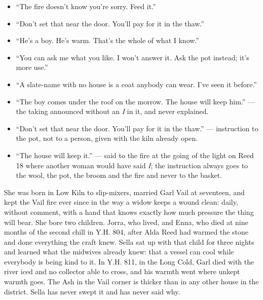 \documentclass{design/chronicle}
\begin{document}
{\begin{itemize}[leftmargin=1.4em,itemsep=1pt,topsep=3pt,parsep=0pt]

\item “The fire doesn’t know you’re sorry. Feed it.”

\item “Don’t set that near the door. You’ll pay for it in the thaw.”

\item “He’s a boy. He’s warm. That’s the whole of what I know.”

\item “You can ask me what you like. I won’t answer it. Ask the pot instead; it’s more use.”

\item “A slate-name with no house is a coat anybody can wear. I’ve seen it before.”

\item “The boy comes under the roof on the morrow. The house will keep him.” --- the taking announced without an \emph{I} in it, and never explained.

\item “Don’t set that near the door. You’ll pay for it in the thaw.” --- instruction to the pot, not to a person, given with the kiln already open.

\item “The house will keep it.” --- said to the fire at the going of the light on Reed 18 where another woman would have said \emph{I}; the instruction always goes to the wool, the pot, the broom and the fire and never to the basket.

\end{itemize}

She was born in Low Kiln to slip-mixers, married Garl Vail at seventeen, and kept the Vail fire ever since in the way a widow keeps a wound clean: daily, without comment, with a hand that knows exactly how much pressure the thing will bear. She bore two children. Jorra, who lived, and Enna, who died at nine months of the second chill in Y.H. 804, after Alda Reed had warmed the stone and done everything the craft knew. Sella sat up with that child for three nights and learned what the midwives already knew: that a vessel can cool while everybody is being kind to it. In Y.H. 811, in the Long Cold, Garl died with the river iced and no collector able to cross, and his warmth went where unkept warmth goes. The Ash in the Vail corner is thicker than in any other house in the district. Sella has never swept it and has never said why.

}
\end{document}
